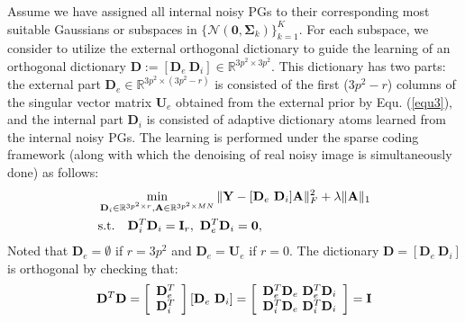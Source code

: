 \documentclass[10pt,twocolumn,letterpaper]{article}
\begin{document}
Assume we have assigned all internal noisy PGs to their corresponding most suitable Gaussians or subspaces in $\{\mathcal{N}(\mathbf{0},\mathbf{\Sigma}_{k})\}_{k=1}^{K}$. For each subspace, we consider to utilize the external orthogonal dictionary to guide the learning of an orthogonal dictionary $\mathbf{D}:=[\mathbf{D}_{e}\ \mathbf{D}_{i}]\in \mathbb{R}^{3p^2\times 3p^2}$. This dictionary has two parts: the external part $\mathbf{D}_{e}\in\mathbb{R}^{3p^2\times (3p^2-r)}$ is consisted of the first ($3p^2-r$) columns of the singular vector matrix $\mathbf{U}_{e}$ obtained from the external prior by Equ. (\ref{equ3}), and the internal part $\mathbf{D}_{i}$ is consisted of adaptive dictionary atoms learned from the internal noisy PGs. The learning is performed under the sparse coding framework (along with which the denoising of real noisy image is simultaneously done) as follows:
\vspace{-2mm}
\begin{equation}\label{equ6}\vspace{-2mm}
\begin{split}
&\min_{\mathbf{D}_{i}\in \mathbb{R}^{3p^2\times r},\textbf{A}\in\mathbb{R}^{3p^2\times MN}}
\|\mathbf{Y}-[\mathbf{D}_{e}\ \mathbf{D}_{i}]\mathbf{A}\|_{F}^{2}+\lambda\|\mathbf{A}\|_{1}
\\
&
\text{s.t.}
\quad
\mathbf{D}_{i}^{T}\mathbf{D}_{i} = \mathbf{I}_{r},\ \mathbf{D}_{e}^{T}\mathbf{D}_{i} = \mathbf{0},
\end{split}
\end{equation}
Noted that $\mathbf{D}_{e}=\emptyset$ if $r=3p^{2}$ and $\mathbf{D}_{e}=\mathbf{U}_{e}$ if $r=0$. The dictionary $\mathbf{D} = [\mathbf{D}_{e}\ \mathbf{D}_{i}]$ is orthogonal by checking that:
\vspace{-2mm}
\begin{equation}\label{equ7}\vspace{-1mm}
\mathbf{D}^{T}\mathbf{D} = 
\left[\begin{array}{c}
\mathbf{D}_{e}^{T}
\\
\mathbf{D}_{i}^{T}
\end{array}\right]
[\mathbf{D}_{e}\ \mathbf{D}_{i}]
=
\left[\begin{array}{cc}
\mathbf{D}_{e}^{T}\mathbf{D}_{e}\ \mathbf{D}_{e}^{T}\mathbf{D}_{i}
\\
\mathbf{D}_{i}^{T}\mathbf{D}_{e}\ \mathbf{D}_{i}^{T}\mathbf{D}_{i}
\end{array}\right]
=
\mathbf{I}
\end{equation}
\end{document}
